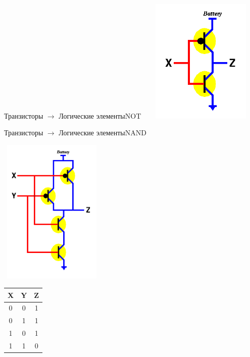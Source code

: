 \begin{frame}[fragile]{Транзисторы $\rightarrow$ Логические элементы}{NOT}
\includegraphics[width=6cm, height=6cm]{Term_1/Source/Pirctures/not-circuit.png}
\end{frame}

\begin{frame}[fragile]{Транзисторы $\rightarrow$ Логические элементы}{NAND}
\begin{multicols}{2}
\includegraphics[width=5cm, height=7cm]{Term_1/Source/Pirctures/nand-circuit.png}
\vfill\eject
\begin{tabular}{ c|c|c } 
X &	Y & Z \\ 
  \hline
0 & 0 & 1\\
  \hline
0 & 1 & 1 \\
 \hline
1 & 0 & 1 \\
 \hline
1 & 1 & 0 \\
\end{tabular}
\end{multicols}
\end{frame}

